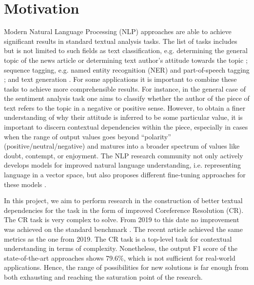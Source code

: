 
\section{Motivation}\label{sec:motication}

Modern Natural Language Processing (NLP) approaches are able to achieve significant results in standard textual analysis tasks. 
The list of tasks includes but is not limited to such fields as text classification, e.g. determining the general topic of the news article \cite{text-classification-Altinel2018} or determining text author's attitude towards the topic \cite{sentiment-analysis-Medhat2014}; sequence tagging,  e.g. named entity recognition (NER)  \cite{ner-Strakova2019,ner-Zhanming2019,ner-Yamada2020,ner-Luoma2020} and part-of-speech tagging \cite{pos-tagging-Bohnet2018}; and text generation \cite{text-gen-Guo2017}. For some applications it is important to combine these tasks to achieve more comprehensible results. 
For instance, in the general case of the sentiment analysis task one aims to classify  whether the author of the piece of text refers to the topic in a negative or positive sense. However, to obtain a finer understanding of why their attitude is inferred to be some particular value, it is important to discern contextual dependencies within the piece, especially in cases when the range of output values goes beyond “polarity” (positive/neutral/negative) and matures into a broader spectrum of values like doubt, contempt, or enjoyment. 
The NLP research community not only actively develops models for improved natural language understanding, i.e. representing language in a vector space, \cite{gpt-Radford2018,bert-Devlin2019,xlnet-Yang2020} but also proposes different fine-tuning approaches for these models \cite{robarta-Liu2019,cr-Joshi2019,gpt2-Radford2019,gpt3-Brown2020}. 

In this project, we aim to perform research in the construction of better textual dependencies for the task in the form of improved Coreference Resolution (CR). 
The CR task is very complex to solve. From 2019 to this date \cite{cr-Joshi2019} no improvement was achieved on the standard benchmark \cite{ontonotes5-Weischedel2013}. 
The recent article \cite{cr-Toshniwal2020} achieved the same metrics as the one from 2019. 
The CR task is a top-level task for contextual understanding in terms of complexity. Nonetheless, the output F1 score of the state-of-the-art approaches shows 79.6\%, which is not sufficient for real-world applications. Hence, the range of possibilities for new solutions is far enough from both exhausting and reaching the saturation point of the research.
 
